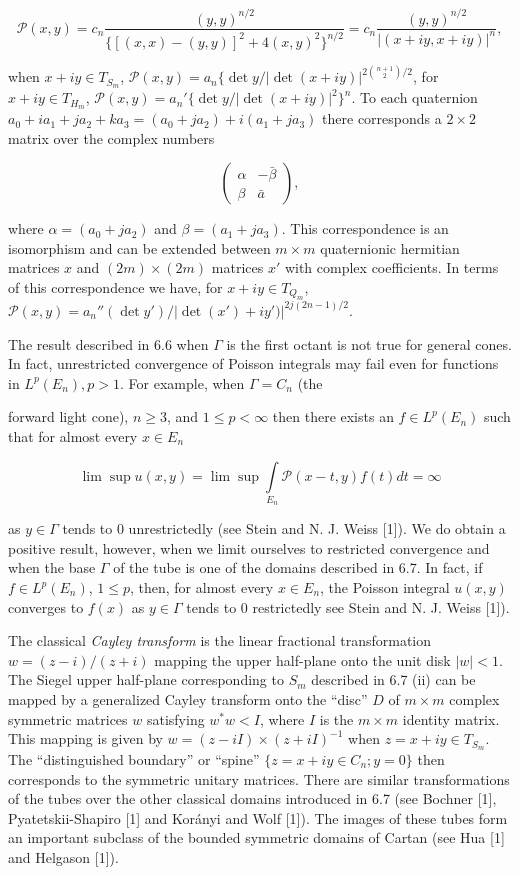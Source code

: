 \[
\mathcal{P}(x,y)=c_{n}\frac{(y,y)^{n/2}}{\{[(x,x)-(y,y)]^{2}+4(x,y)^{2}\}^{n/2}}=c_{n}\frac{(y,y)^{n/2}}{|(x+iy,x+iy)|^{n}},
\]

when $x + iy \in T_{S_m}$, $\mathcal{P}(x, y) = a_n\{\det y/|\det(x + iy)|^{2\binom{n+1}{2}/2}$, for $x + iy \in T_{H_m}$, $\mathcal{P}(x, y) = a_n'\{\det y/|\det(x + iy)|^{2}\}^n$. To each quaternion $a_0 + ia_1 + ja_2 + ka_3 = (a_0 + ja_2) + i(a_1 + ja_3)$ there corresponds a $2 \times 2$ matrix over the complex numbers

\[
\begin{pmatrix}\alpha&-\bar{\beta}\\ \beta&\bar{a}\end{pmatrix},
\]

where $\alpha = (a_0 + j a_2)$ and $\beta = (a_1 + j a_3)$. This correspondence is an isomorphism and can be extended between $m \times m$ quaternionic hermitian matrices $x$ and $(2m) \times (2m)$ matrices $x'$ with complex coefficients. In terms of this correspondence we have, for $x + iy \in T_{Q_m}$, $\mathcal{P}(x, y) = a_n''(\det y') / |\det(x') + iy')|^{2j(2n-1)/2}$.

 The result described in 6.6 when $\Gamma$ is the first octant is not true for general cones. In fact, unrestricted convergence of Poisson integrals may fail even for functions in $L^p(E_n), p > 1$. For example, when $\Gamma = C_n$ (the

forward light cone), $n \geq 3$, and $1 \leq p < \infty$ then there exists an $f \in L^{p}(E_{n})$ such that for almost every $x \in E_{n}$

\[
\lim\sup u(x,y)=\lim\sup\int\limits_{E_{n}}\mathcal{P}(x-t,y)f(t)dt=\infty
\]

as $y \in \Gamma$ tends to 0 unrestrictedly (see Stein and N. J. Weiss [1]). We do obtain a positive result, however, when we limit ourselves to restricted convergence and when the base $\Gamma$ of the tube is one of the domains described in 6.7. In fact, if $f \in L^p(E_n)$, $1 \leq p$, then, for almost every $x \in E_n$, the Poisson integral $u(x, y)$ converges to $f(x)$ as $y \in \Gamma$ tends to 0 restrictedly see Stein and N. J. Weiss [1]).

 The classical \textit{Cayley transform} is the linear fractional transformation $w = (z - i)/(z + i)$ mapping the upper half-plane onto the unit disk $|w| < 1$. The Siegel upper half-plane corresponding to $S_m$ described in 6.7 (ii) can be mapped by a generalized Cayley transform onto the ``disc'' $D$ of $m \times m$ complex symmetric matrices $w$ satisfying $w^*w < I$, where $I$ is the $m \times m$ identity matrix. This mapping is given by $w = (z - iI) \times (z + iI)^{-1}$ when $z = x + iy \in T_{S_m}$. The ``distinguished boundary'' or ``spine'' $\{z = x + iy \in C_n; y = 0\}$ then corresponds to the symmetric unitary matrices. There are similar transformations of the tubes over the other classical domains introduced in 6.7 (see Bochner [1], Pyatetskii-Shapiro [1] and Korányi and Wolf [1]). The images of these tubes form an important subclass of the bounded symmetric domains of Cartan (see Hua [1] and Helgason [1]).

